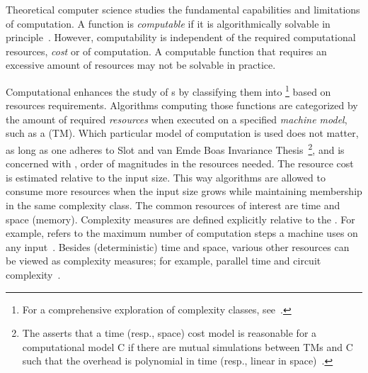 Theoretical computer science studies the fundamental capabilities and
limitations of computation. A function is \emph{computable} if it is algorithmically solvable in principle~\cite[\mbox{p.
234}]{sipser2012}. However, computability is independent of the required
computational resources, \ie \emph{cost} or \emph{} of
computation. A computable function that requires an excessive amount of
resources may not be solvable in practice.

Computational  enhances the study of s by classifying them into \emph{}\footnote{For
a comprehensive exploration of complexity classes,
see~\textcite{complexityzoo}.} based on resources requirements. Algorithms computing those functions are categorized by the amount of
required \emph{resources} when executed on a specified
\emph{machine model}, such as a  (TM). Which particular
model of computation is used does not matter, as long as
one adheres to Slot and van Emde Boas Invariance Thesis~\cite{slot1984}\footnote{The  asserts that a
time (resp., space) cost model is reasonable for a computational model
C if there are mutual simulations between TMs and C such
that the overhead is polynomial in time (resp., linear in
space)~\cite{vanoni2022}.}, and is concerned with , \ie
order of magnitudes in the resources needed. The resource cost is estimated relative to the input size. This way algorithms are allowed
to consume more resources when the input size grows while maintaining membership
in the same complexity class. The common resources of
interest are time and space (memory). Complexity measures are defined
explicitly relative to the . For example,  refers to the maximum number of computation steps a
machine uses on any input~\cite[p. 276]{sipser2012}.
Besides (deterministic) time and space, various other resources can be viewed as
complexity measures; for example, parallel
time and circuit complexity~\cite[p. 428]{sipser2012}.

